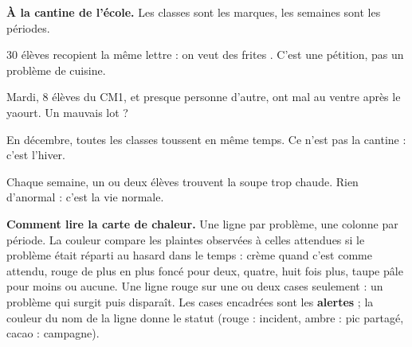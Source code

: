 \begin{enfant}
\textbf{À la cantine de l'école.} Les classes sont les marques, les semaines sont les périodes.
\end{enfant}
\begin{tcbraster}[raster columns=2, raster equal height, raster column skip=6pt, raster row skip=6pt, raster every box/.style={unbreakable}]
\begin{kpibox}[title={\faBullhorn\ Campagne}, unbreakable]
\small 30 élèves recopient la même lettre : \og on veut des frites \fg. C'est une pétition, pas un problème
de cuisine.
\end{kpibox}
\begin{kpibox}[title={\faExclamationTriangle\ Incident candidat}, unbreakable]
\small Mardi, 8 élèves du CM1, et presque personne d'autre, ont mal au ventre après le yaourt. Un mauvais
lot ?
\end{kpibox}
\begin{kpibox}[title={\faSun\ Pic partagé}, unbreakable]
\small En décembre, toutes les classes toussent en même temps. Ce n'est pas la cantine : c'est l'hiver.
\end{kpibox}
\begin{kpibox}[title={\faMugHot\ Fond}, unbreakable]
\small Chaque semaine, un ou deux élèves trouvent la soupe trop chaude. Rien d'anormal : c'est la vie
normale.
\end{kpibox}
\end{tcbraster}


\begin{lire}
\textbf{Comment lire la carte de chaleur.} Une ligne par problème, une colonne par période. La couleur
compare les plaintes observées à celles attendues si le problème était réparti au hasard dans le temps :
crème quand c'est comme attendu, rouge de plus en plus foncé pour deux, quatre, huit fois plus, taupe pâle
pour moins ou aucune. Une ligne rouge sur une ou deux cases seulement : un problème qui surgit puis
disparaît. Les cases encadrées sont les \textbf{alertes} ; la couleur du nom de la ligne donne le statut
(rouge : incident, ambre : pic partagé, cacao : campagne).
\end{lire}
